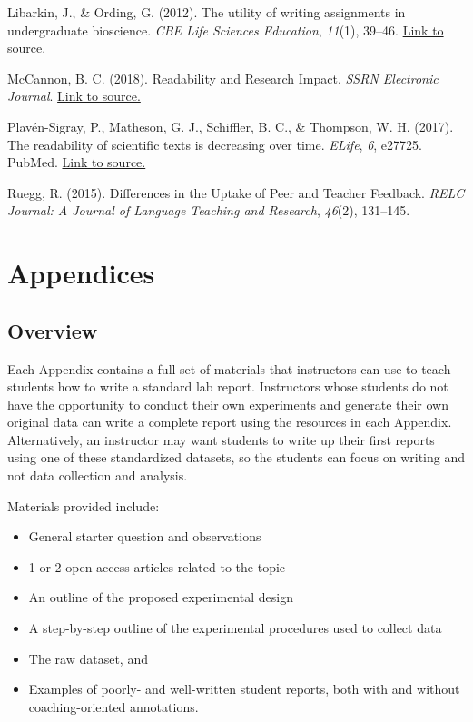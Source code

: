 \documentclass[
]{book}
\providecommand{\tightlist}{%
  \setlength{\itemsep}{0pt}\setlength{\parskip}{0pt}}
\begin{document}
Libarkin, J., \& Ording, G. (2012). The utility of writing assignments in undergraduate bioscience. \emph{CBE Life Sciences Education}, \emph{11}(1), 39--46. \href{https://doi.org/10.1187/cbe.11-07-0058}{Link to source.}

McCannon, B. C. (2018). Readability and Research Impact. \emph{SSRN Electronic Journal}. \href{https://doi.org/10.2139/ssrn.3341573}{Link to source.}

Plavén-Sigray, P., Matheson, G. J., Schiffler, B. C., \& Thompson, W. H. (2017). The readability of scientific texts is decreasing over time. \emph{ELife}, \emph{6}, e27725. PubMed. \href{https://doi.org/10.7554/eLife.27725}{Link to source.}

Ruegg, R. (2015). Differences in the Uptake of Peer and Teacher Feedback. \emph{RELC Journal: A Journal of Language Teaching and Research}, \emph{46}(2), 131--145.

\hypertarget{part-appendices}{%
\part{Appendices}\label{part-appendices}}

\hypertarget{overview}{%
\chapter*{Overview}\label{overview}}

Each Appendix contains a full set of materials that instructors can use to teach students how to write a standard lab report. Instructors whose students do not have the opportunity to conduct their own experiments and generate their own original data can write a complete report using the resources in each Appendix. Alternatively, an instructor may want students to write up their first reports using one of these standardized datasets, so the students can focus on writing and not data collection and analysis.

Materials provided include:

\begin{itemize}
\tightlist
\item
  General starter question and observations
\item
  1 or 2 open-access articles related to the topic
\item
  An outline of the proposed experimental design
\item
  A step-by-step outline of the experimental procedures used to collect data
\item
  The raw dataset, and
\item
  Examples of poorly- and well-written student reports, both with and without coaching-oriented annotations.
\end{itemize}
\end{document}
